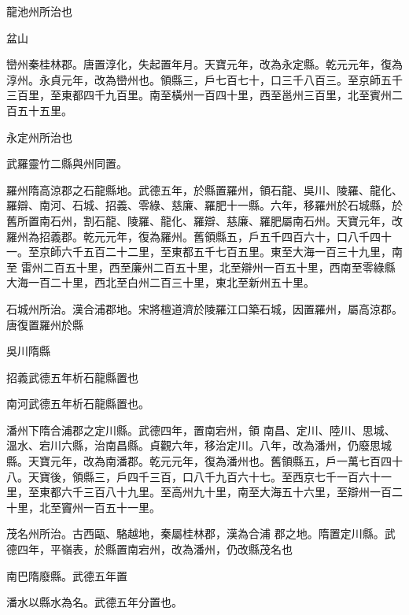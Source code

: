 \begin{pinyinscope}
 龍池州所治也



 盆山



 巒州秦桂林郡。唐置淳化，失起置年月。天寶元年，改為永定縣。乾元元年，復為淳州。永貞元年，改為巒州也。領縣三，戶七百七十，口三千八百三。至京師五千三百里，至東都四千九百里。南至橫州一百四十里，西至邕州三百里，北至賓州二百五十五里。



 永定州所治也



 武羅靈竹二縣與州同置。



 羅州隋高涼郡之石龍縣地。武德五年，於縣置羅州，領石龍、吳川、陵羅、龍化、羅辯、南河、石城、招義、零綠、慈廉、羅肥十一縣。六年，移羅州於石城縣，於舊所置南石州，割石龍、陵羅、龍化、羅辯、慈廉、羅肥屬南石州。天寶元年，改羅州為招義郡。乾元元年，復為羅州。舊領縣五，戶五千四百六十，口八千四十一。至京師六千五百二十二里，至東都五千七百五里。東至大海一百三十九里，南至
 雷州二百五十里，西至廉州二百五十里，北至辯州一百五十里，西南至零綠縣大海一百二十里，西北至白州二百三十里，東北至新州五十里。



 石城州所治。漢合浦郡地。宋將檀道濟於陵羅江口築石城，因置羅州，屬高涼郡。唐復置羅州於縣



 吳川隋縣



 招義武德五年析石龍縣置也



 南河武德五年析石龍縣置也。



 潘州下隋合浦郡之定川縣。武德四年，置南宕州，領
 南昌、定川、陸川、思城、溫水、宕川六縣，治南昌縣。貞觀六年，移治定川。八年，改為潘州，仍廢思城縣。天寶元年，改為南潘郡。乾元元年，復為潘州也。舊領縣五，戶一萬七百四十八。天寶後，領縣三，戶四千三百，口八千九百六十七。至西京七千一百六十一里，至東都六千三百八十九里。至高州九十里，南至大海五十六里，至辯州一百二十里，北至竇州一百五十一里。



 茂名州所治。古西甌、駱越地，秦屬桂林郡，漢為合浦
 郡之地。隋置定川縣。武德四年，平嶺表，於縣置南宕州，改為潘州，仍改縣茂名也



 南巴隋廢縣。武德五年置



 潘水以縣水為名。武德五年分置也。




\end{pinyinscope}
